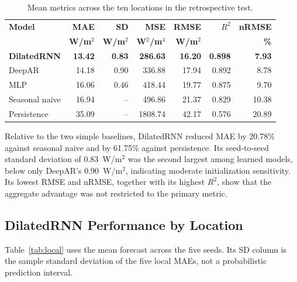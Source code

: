 \documentclass[runningheads]{llncs}
\begin{document}
\begin{table}[t]
\caption{Mean metrics across the ten locations in the retrospective test.}
\label{tab:overall}
\centering
\scriptsize
\setlength{\tabcolsep}{3.2pt}
\begin{tabular}{@{}lrrrrrr@{}}
\toprule
\textbf{Model} & \textbf{MAE} & \textbf{SD} & \textbf{MSE} & \textbf{RMSE} & \textbf{$R^2$} & \textbf{nRMSE} \\
 & \textbf{W/m$^2$} & \textbf{W/m$^2$} & \textbf{W$^2$/m$^4$} & \textbf{W/m$^2$} & & \textbf{\%} \\
\midrule
\textbf{DilatedRNN} & \textbf{13.42} & \textbf{0.83} & \textbf{286.63} & \textbf{16.20} & \textbf{0.898} & \textbf{7.93} \\
DeepAR         & 14.18 & 0.90 & 336.88  & 17.94 & 0.892 & 8.78 \\
MLP            & 16.06 & 0.46 & 418.44  & 19.77 & 0.875 & 9.70 \\
Seasonal naive & 16.94 & --   & 496.86  & 21.37 & 0.829 & 10.38 \\
Persistence    & 35.09 & --   & 1808.74 & 42.17 & 0.576 & 20.89 \\
\bottomrule
\end{tabular}
\end{table}

Relative to the two simple baselines, DilatedRNN reduced MAE by 20.78\% against seasonal naive and by 61.75\% against persistence. Its seed-to-seed standard deviation of 0.83~W/m$^2$ was the second largest among learned models, below only DeepAR's 0.90~W/m$^2$, indicating moderate initialization sensitivity. Its lowest RMSE and nRMSE, together with its highest $R^2$, show that the aggregate advantage was not restricted to the primary metric.

\subsection{DilatedRNN Performance by Location}

Table~\ref{tab:local} uses the mean forecast across the five seeds. Its SD column is the sample standard deviation of the five local MAEs, not a probabilistic prediction interval.
\end{document}
